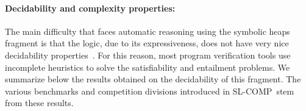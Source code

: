 \documentclass[twoside,11pt]{article}
\newcommand{\sep}{.\,}
\newcommand{\preds}{\mathbb{P}}
\newcommand{\loc}{\mathit{Loc}}
\newcommand{\model}[1]{\left[\!\left[#1\right]\!\right]}
\newcommand{\slcomp}{\textsf{SL-COMP}}
\begin{document}
%



\paragraph{Decidability and complexity properties:}
The main difficulty that faces automatic reasoning using the symbolic heaps fragment is that the logic, 
due to its expressiveness, does not have very nice decidability properties~\cite{AntonopoulosGHKO14}.
For this reason, most program verification tools use incomplete heuristics to solve the satisfiability and entailment problems.
%
We summarize below the results obtained on the decidability of this fragment.
The various benchmarks and competition divisions introduced in \slcomp\ stem from these results.
\end{document}
